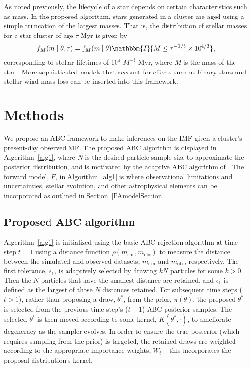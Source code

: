 \documentclass[ejs]{imsart}
\numberwithin{equation}{section}
\theoremstyle{plain}
\newcommand{\indic}{\mathbbm{I}}
\newcommand{\msim}{m_{\text{sim}}}
\newcommand{\mobs}{m_{\text{obs}}}
\begin{document}
As noted previously, the lifecycle of a star depends on certain characteristics such as mass.  In the proposed algorithm, stars generated in a cluster are aged using a simple truncation of the largest masses.  
That is, the distribution of stellar masses for a star cluster of age $\tau$ Myr is given by
	\begin{align}
	f_M(m \mid \theta, \tau) = f_M(m \mid \theta) \indic \{M \leq \tau^{-1/3} \times 10^{4/3}\} \text{,}
	\label{eq:age}
	\end{align}
corresponding to stellar lifetimes of 10$^4$ $M^{-3}$ Myr, where $M$ is the mass of the star \citep{hansen2004, Chaisson:2011}. 
More sophisticated models that account for effects such as binary stars and stellar wind mass loss can be inserted into this framework.  



\section{Methods}
\label{methodSec}

We propose an ABC framework to make inferences on the IMF given a cluster's present-day observed MF.  The proposed ABC algorithm is displayed in Algorithm~\eqref{alg1}, where $N$ is the desired particle sample size to approximate the posterior distribution, and is motivated by the adaptive ABC algorithm of \cite{beaumont2009}.  The forward model, $F$, in Algorithm~\eqref{alg1} is where observational limitations and uncertainties, stellar evolution, and other astrophysical elements can be incorporated as outlined in Section~\ref{PAmodelSection}.


\subsection{Proposed ABC algorithm}
Algorithm~\eqref{alg1} is initialized using the basic ABC rejection algorithm at time step $t = 1$ using a distance function $\rho(\msim, \mobs)$ to measure the distance between the simulated and observed datasets, $\msim$ and $\mobs$, respectively.  The first tolerance, $\epsilon_1$, is adaptively selected by drawing $kN$ particles for some $k >0$.  Then the $N$ particles that have the smallest distance are retained, and $\epsilon_1$ is defined as the largest of those $N$ distances retained.
%
For subsequent time steps ($t > 1$), rather than proposing a draw, $\theta^*$, from the prior, $\pi(\theta)$, the proposed $\theta^*$ is selected from the previous time step's ($t-1$) ABC posterior samples.  The selected $\theta^*$ is then moved according to some kernel, $K(\theta^*, \cdot)$, to ameliorate degeneracy as the sampler evolves.  In order to ensure the true posterior (which requires sampling from the prior) is targeted, the retained draws are weighted according to the appropriate importance weights, $W_t$ -- this incorporates the proposal distribution's kernel.
\end{document}

